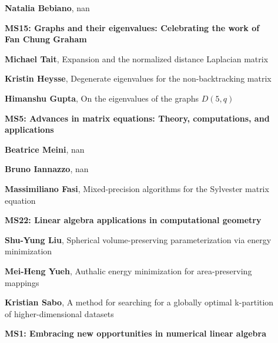 \documentclass[ILAS2025-program.tex]{subfiles}
\begin{document}
\begin{description}
\begin{description}
        \item[] \textbf{Natalia Bebiano}, nan
        \end{description}
    \begin{description}
    \item[] {\color{mstitle}\textbf{MS15: Graphs and their eigenvalues: Celebrating the work of Fan Chung Graham}} 
    \item[] \textbf{Michael Tait}, Expansion and the normalized distance Laplacian matrix
        \item[] \textbf{Kristin Heysse}, Degenerate eigenvalues for the non-backtracking matrix
        \item[] \textbf{Himanshu Gupta}, On the eigenvalues of the graphs $D(5, q)$
        \end{description}
    \begin{description}
    \item[] {\color{mstitle}\textbf{MS5: Advances in matrix equations: Theory, computations, and applications}} 
    \item[] \textbf{Beatrice Meini}, nan
        \item[] \textbf{Bruno Iannazzo}, nan
        \item[] \textbf{Massimiliano Fasi}, Mixed-precision algorithms for the Sylvester matrix equation
        \end{description}
    \begin{description}
    \item[] {\color{mstitle}\textbf{MS22: Linear algebra applications in computational geometry}} 
    \item[] \textbf{Shu-Yung Liu}, Spherical volume-preserving parameterization via energy minimization
        \item[] \textbf{Mei-Heng Yueh}, Authalic energy minimization for area-preserving mappings
        \item[] \textbf{Kristian Sabo}, A method for searching for a globally optimal k-partition of higher-dimensional datasets
        \end{description}
    \begin{description}
    \item[] {\color{mstitle}\textbf{MS1: Embracing new opportunities in numerical linear algebra}} 

\end{description}
\end{description}
\end{document}
